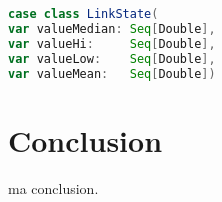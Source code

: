   

\begin{lstlisting}[language=scala, caption={La classe LinkState en Scala }]
case class LinkState(
var valueMedian: Seq[Double],
var valueHi:     Seq[Double],
var valueLow:    Seq[Double],
var valueMean:   Seq[Double])
\end{lstlisting}


\section{Conclusion}
ma conclusion.
